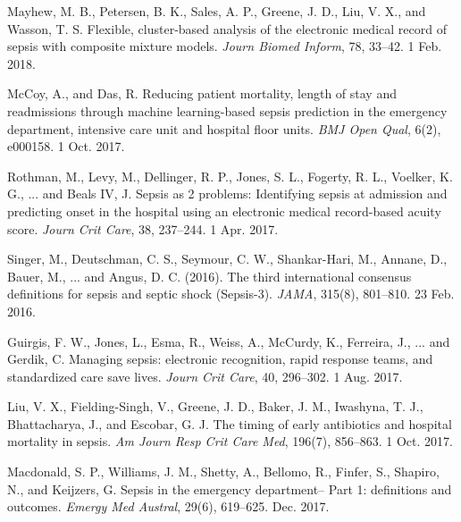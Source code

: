\documentclass{amia}
\begin{document}
\begin{thebibliography}{1}
        Mayhew, M. B., Petersen, B. K., Sales, A. P., Greene, J. D., Liu, V. X., and Wasson, T. S. 
        Flexible, cluster-based analysis of the electronic medical record of sepsis with 
        composite mixture models. {\it Journ Biomed Inform}, 78, 33--42. 1 Feb. 2018.

        McCoy, A., and Das, R. Reducing patient mortality, length of stay and readmissions through machine 
        learning-based sepsis prediction in the emergency department, intensive care unit and hospital 
        floor units. {\it BMJ Open Qual}, 6(2), e000158. 1 Oct. 2017.

        Rothman, M., Levy, M., Dellinger, R. P., Jones, S. L., Fogerty, R. L., Voelker, K. G., ... and Beals IV, J. 
        Sepsis as 2 problems: Identifying sepsis at admission and predicting onset in the hospital using an electronic 
        medical record-based acuity score. {\it Journ Crit Care}, 38, 237--244. 1 Apr. 2017.


        Singer, M., Deutschman, C. S., Seymour, C. W., Shankar-Hari, M., Annane, D., Bauer, M., ... and
        Angus, D. C. (2016). The third international consensus definitions for sepsis and septic shock (Sepsis-3). 
        {\it JAMA}, 315(8), 801--810. 23 Feb. 2016.

        Guirgis, F. W., Jones, L., Esma, R., Weiss, A., McCurdy, K., Ferreira, J., ... and Gerdik, C. 
        Managing sepsis: electronic recognition, rapid response teams, and standardized care save lives. 
        {\it Journ Crit Care}, 40, 296--302. 1 Aug. 2017.

        Liu, V. X., Fielding-Singh, V., Greene, J. D., Baker, J. M., Iwashyna, T. J., Bhattacharya, J., and 
        Escobar, G. J. The timing of early antibiotics and hospital mortality in sepsis. 
        {\it Am Journ Resp Crit Care Med}, 196(7), 856--863. 1 Oct. 2017.

        Macdonald, S. P., Williams, J. M., Shetty, A., Bellomo, R., Finfer, S., Shapiro, N., and Keijzers, G. 
        Sepsis in the emergency department-- Part 1: definitions and outcomes. 
        {\it Emergy Med Austral}, 29(6), 619--625. Dec. 2017.

\end{thebibliography}
\end{document}
